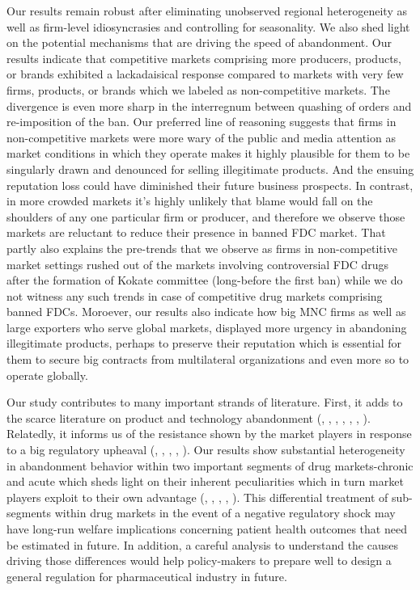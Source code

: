 \documentclass[AER]{AEA}
\theoremstyle{theorem}
\begin{document}
Our results remain robust after eliminating  unobserved regional heterogeneity as well as firm-level idiosyncrasies and controlling for seasonality. We also shed light on the potential mechanisms that are driving the speed of abandonment. Our results indicate that competitive markets comprising more producers, products, or brands exhibited a lackadaisical response compared to markets with very few firms, products, or brands which we labeled as non-competitive markets. The divergence is even more sharp in the interregnum between quashing of orders and re-imposition of the ban. Our preferred line of reasoning suggests that firms in non-competitive markets were more wary of the public and media attention as market conditions in which they operate makes it highly plausible for them to be singularly drawn and denounced for selling illegitimate products. And the ensuing reputation loss could have diminished their future business prospects. In contrast, in more crowded markets it's highly unlikely that blame would fall on the shoulders of any one particular firm or producer, and therefore we observe those markets are reluctant to reduce their presence in banned FDC market. That partly also explains the pre-trends that we observe as firms in non-competitive market settings rushed out of the markets involving controversial FDC drugs after the formation of Kokate committee (long-before the first ban) while we do not witness any such trends in case of competitive drug markets comprising banned FDCs. Moroever, our results also indicate how big MNC firms as well as large exporters who serve global markets, displayed more urgency in abandoning illegitimate products, perhaps to preserve their reputation which is essential for them to secure big contracts from multilateral organizations and even more so to operate globally.

Our study contributes to many important strands of literature. First, it adds to the scarce literature on product and technology abandonment (\cite{finkelstein1985scientific}, \cite{greve1995jumping}, \cite{kennedy2011diffusion}, \cite{howard2012comparative}, \cite{agarwal2014abandoning}, \cite{greenwood2017and}, \cite{aggarwal2020science}). Relatedly, it informs us of the resistance shown by the market players in response to a big regulatory upheaval (\cite{fernandez1991resistance}, \cite{aldous2014police}, \cite{helm2006regulatory}, \cite{kroszner1998political}, \cite{tilton1997regulatory}). Our results show substantial heterogeneity in abandonment behavior within two important segments of drug markets-chronic and acute which sheds light on their inherent peculiarities which in turn market players exploit to their own advantage (\cite{gemmil2008price}, \cite{piette2006conceptually}, \cite{solomon2009cost}, \cite{goldman2004pharmacy}, \cite{skipper2013demand}). This differential treatment of sub-segments within drug markets in the event of a negative regulatory shock may have long-run welfare implications concerning patient health outcomes that need be estimated in future. In addition, a careful analysis to understand the causes driving those differences would help policy-makers to prepare well to design a general regulation for pharmaceutical industry in future.
\end{document}
